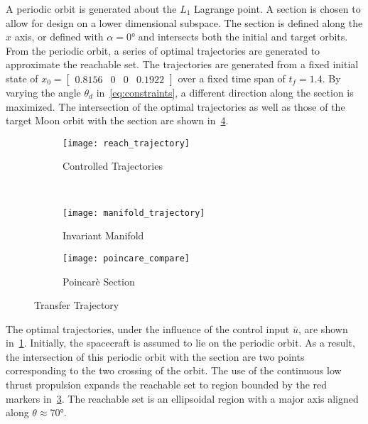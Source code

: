 \documentclass[letterpaper, paper,11pt]{AAS}		%
\begin{document}
A periodic orbit is generated about the \( L_1 \) Lagrange point. 
A \Poincare section is chosen to allow for design on a lower dimensional subspace.
The section is defined along the \( \hat{x} \) axis, or defined with \( \alpha = \ang{0} \) and intersects both the initial and target orbits.
From the periodic orbit, a series of optimal trajectories are generated to approximate the reachable set.
The trajectories are generated from a fixed initial state of \( x_0 = \begin{bmatrix}0.8156 & 0 & 0 & 0.1922 \end{bmatrix} \) over a fixed time span of \( t_f = 1.4 \).
By varying the angle \( \theta_d\) in~\cref{eq:constraints}, a different direction along the \Poincare section is maximized. 
The intersection of the optimal trajectories as well as those of the target Moon orbit with the \Poincare section are shown in~\cref{fig:transfer_orbit}.
\begin{figure} 
	\centering 
	\begin{subfigure}[htbp]{0.5\textwidth} 
		\texttt{[image: reach\_trajectory]} 
		\caption{Controlled Trajectories} \label{fig:reach_trajectory} 
	\end{subfigure}~ %
	\begin{subfigure}[htbp]{0.5\textwidth} 
		\texttt{[image: manifold\_trajectory]} 
		\caption{Invariant Manifold} \label{fig:manifold_trajectory} 
	\end{subfigure} 
	
	\begin{subfigure}[htbp]{0.5\textwidth} 
		\texttt{[image: poincare\_compare]} 
		\caption{Poincar\`e Section} \label{fig:poincare_compare} 
	\end{subfigure} 
	\caption{Transfer Trajectory}
	\label{fig:transfer_orbit} 
\end{figure}
The optimal trajectories, under the influence of the control input \( \bar{u} \), are shown in~\cref{fig:reach_trajectory}.
Initially, the spacecraft is assumed to lie on the periodic orbit.
As a result, the intersection of this periodic orbit with the \Poincare section are two points corresponding to the two crossing of the orbit.
The use of the continuous low thrust propulsion expands the reachable set to region bounded by the red markers in~\cref{fig:poincare_compare}.
The reachable set is an ellipsoidal region with a major axis aligned along \( \theta \approx \ang{70} \).
\end{document}
